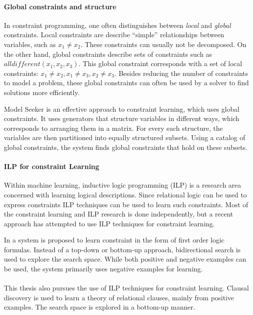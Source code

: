 \paragraph{Global constraints and structure}
In constraint programming, one often distinguishes between \textit{local} and \textit{global} constraints.
Local constraints are describe ``simple'' relationships between variables, such as $x_1 \neq x_2$.
These constraints can usually not be decomposed.
On the other hand, global constraints describe sets of constraints such as $\mathit{alldifferent}(x_1, x_2, x_3)$.
This global constraint corresponds with a set of local constraints: $x_1 \neq x_2, x_1 \neq x_3, x_2 \neq x_3$.
Besides reducing the number of constraints to model a problem, these global constraints can often be used by a solver to find solutions more efficiently.

Model Seeker \cite{Beldiceanu:ModelSeeker} is an effective approach to constraint learning, which uses global constraints.
It uses generators that structure variables in different ways, which corresponds to arranging them in a matrix.
For every such structure, the variables are then partitioned into equally structured subsets.
Using a catalog of global constraints, the system finds global constraints that hold on these subsets.

\paragraph{ILP for constraint Learning}
Within machine learning, inductive logic programming (ILP) is a research area concerned with learning logical descriptions.
Since relational logic can be used to express constraints ILP techniques can be used to learn such constraints.
Most of the constraint learning and ILP research is done independently, but a recent approach has attempted to use ILP techniques for constraint learning.

In \cite{Lallouet:LearningCP} a system is proposed to learn constraint in the form of first order logic formulas.
Instead of a top-down or bottom-up approach, bidirectional search is used to explore the search space.
While both positive and negative examples can be used, the system primarily uses negative examples for learning.
\\\\
This thesis also pursues the use of ILP techniques for constraint learning.
Clausal discovery is used to learn a theory of relational clauses, mainly from positive examples.
The search space is explored in a bottom-up manner.

